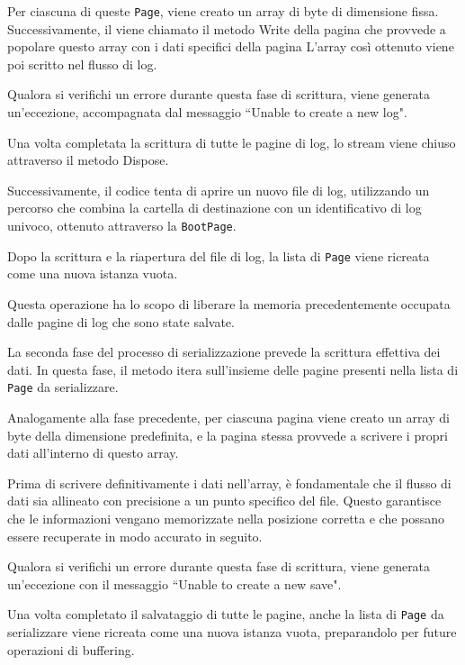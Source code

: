 \documentclass[12pt,a4paper,openright,twoside]{book}
\begin{document}
                    Per ciascuna di queste \texttt{Page}, viene creato un array di byte di dimensione fissa. Successivamente, il viene chiamato il metodo Write della pagina che provvede a popolare questo array con i dati specifici della pagina L'array così ottenuto viene poi scritto nel flusso di log.

                    Qualora si verifichi un errore durante questa fase di scrittura, viene generata un'eccezione, accompagnata dal messaggio ``Unable to create a new log".

                    Una volta completata la scrittura di tutte le pagine di log, lo stream viene chiuso attraverso il metodo Dispose.

                    Successivamente, il codice tenta di aprire un nuovo file di log, utilizzando un percorso che combina la cartella di destinazione con un identificativo di log univoco, ottenuto attraverso la \texttt{BootPage}.

                    Dopo la scrittura e la riapertura del file di log, la lista di \texttt{Page} viene ricreata come una nuova istanza vuota.

                    Questa operazione ha lo scopo di liberare la memoria precedentemente occupata dalle pagine di log che sono state salvate.

                    \pagebreak

                    La seconda fase del processo di serializzazione prevede la scrittura effettiva dei dati. In questa fase, il metodo itera sull'insieme delle pagine presenti nella lista di \texttt{Page} da serializzare.

                    Analogamente alla fase precedente, per ciascuna pagina viene creato un array di byte della dimensione predefinita, e la pagina stessa provvede a scrivere i propri dati all'interno di questo array.

                    Prima di scrivere definitivamente i dati nell'array, è fondamentale che il flusso di dati sia allineato con precisione a un punto specifico del file. Questo garantisce che le informazioni vengano memorizzate nella posizione corretta e che possano essere recuperate in modo accurato in seguito.

                    Qualora si verifichi un errore durante questa fase di scrittura, viene generata un'eccezione con il messaggio ``Unable to create a new save".

                    Una volta completato il salvataggio di tutte le pagine, anche la lista di \texttt{Page} da serializzare viene ricreata come una nuova istanza vuota, preparandolo per future operazioni di buffering.
\end{document}
